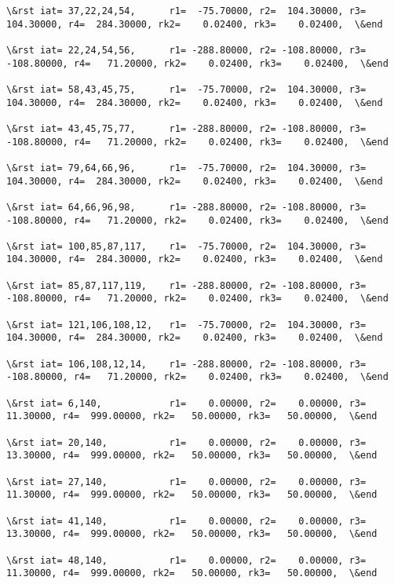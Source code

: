 \documentclass[11pt]{article}
\begin{document}
\begin{Verbatim}[commandchars=\\\{\}]
\&rst iat= 37,22,24,54,      r1=  -75.70000, r2=  104.30000, r3=  104.30000, r4=  284.30000, rk2=    0.02400, rk3=    0.02400,  \&end

\&rst iat= 22,24,54,56,      r1= -288.80000, r2= -108.80000, r3= -108.80000, r4=   71.20000, rk2=    0.02400, rk3=    0.02400,  \&end

\&rst iat= 58,43,45,75,      r1=  -75.70000, r2=  104.30000, r3=  104.30000, r4=  284.30000, rk2=    0.02400, rk3=    0.02400,  \&end

\&rst iat= 43,45,75,77,      r1= -288.80000, r2= -108.80000, r3= -108.80000, r4=   71.20000, rk2=    0.02400, rk3=    0.02400,  \&end

\&rst iat= 79,64,66,96,      r1=  -75.70000, r2=  104.30000, r3=  104.30000, r4=  284.30000, rk2=    0.02400, rk3=    0.02400,  \&end

\&rst iat= 64,66,96,98,      r1= -288.80000, r2= -108.80000, r3= -108.80000, r4=   71.20000, rk2=    0.02400, rk3=    0.02400,  \&end

\&rst iat= 100,85,87,117,    r1=  -75.70000, r2=  104.30000, r3=  104.30000, r4=  284.30000, rk2=    0.02400, rk3=    0.02400,  \&end

\&rst iat= 85,87,117,119,    r1= -288.80000, r2= -108.80000, r3= -108.80000, r4=   71.20000, rk2=    0.02400, rk3=    0.02400,  \&end

\&rst iat= 121,106,108,12,   r1=  -75.70000, r2=  104.30000, r3=  104.30000, r4=  284.30000, rk2=    0.02400, rk3=    0.02400,  \&end

\&rst iat= 106,108,12,14,    r1= -288.80000, r2= -108.80000, r3= -108.80000, r4=   71.20000, rk2=    0.02400, rk3=    0.02400,  \&end

\&rst iat= 6,140,            r1=    0.00000, r2=    0.00000, r3=   11.30000, r4=  999.00000, rk2=   50.00000, rk3=   50.00000,  \&end

\&rst iat= 20,140,           r1=    0.00000, r2=    0.00000, r3=   13.30000, r4=  999.00000, rk2=   50.00000, rk3=   50.00000,  \&end

\&rst iat= 27,140,           r1=    0.00000, r2=    0.00000, r3=   11.30000, r4=  999.00000, rk2=   50.00000, rk3=   50.00000,  \&end

\&rst iat= 41,140,           r1=    0.00000, r2=    0.00000, r3=   13.30000, r4=  999.00000, rk2=   50.00000, rk3=   50.00000,  \&end

\&rst iat= 48,140,           r1=    0.00000, r2=    0.00000, r3=   11.30000, r4=  999.00000, rk2=   50.00000, rk3=   50.00000,  \&end


\end{Verbatim}
\end{document}
